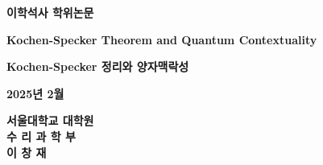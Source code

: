 \begin{titlepage}
    \begin{center}
    \huge
    \textbf{이학석사 학위논문}    
    \vspace*{2cm}
    
    \LARGE
    \textbf{Kochen-Specker Theorem and Quantum Contextuality}
    
    \vspace{1.0cm}
    \LARGE
    \textbf{Kochen-Specker 정리와 양자맥락성}
    
    \vspace{2.0cm}
    
    \textbf{2025년 2월}
    
    \vfill
    
    
    
    \Large

    \textbf{서울대학교 대학원}\\
    \textbf{수 리 과 학 부}\\
    \vspace{0.5cm}
    \textbf{이 창 재}
    
    \end{center}
\end{titlepage}

